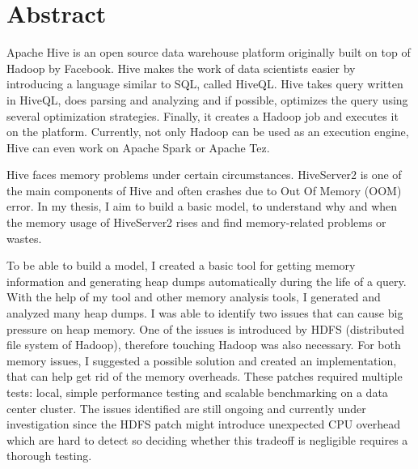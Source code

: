 \vfill
\selectenglish


\chapter*{Abstract}
Apache Hive is an open source data warehouse platform originally built on top of Hadoop by Facebook. Hive makes the work of data scientists easier by introducing a language similar to SQL, called HiveQL. Hive takes query written in HiveQL, does parsing and analyzing and if possible, optimizes the query using several optimization strategies. Finally, it creates a Hadoop job and executes it on the platform. Currently, not only Hadoop can be used as an execution engine, Hive can even work on Apache Spark or Apache Tez. 

Hive faces memory problems under certain circumstances. HiveServer2 is one of the main components of Hive and often crashes due to Out Of Memory (OOM) error. In my thesis, I aim to build a basic model, to understand why and when the memory usage of HiveServer2 rises and find memory-related problems or wastes.

To be able to build a model, I created a basic tool for getting memory information and generating heap dumps automatically during the life of a query. With the help of my tool and other memory analysis tools, I generated and analyzed many heap dumps. I was able to identify two issues that can cause big pressure on heap memory. One of the issues is introduced by HDFS (distributed file system of Hadoop), therefore touching Hadoop was also necessary. For both memory issues, I suggested a possible solution and created an implementation, that can help get rid of the memory overheads. These patches required multiple tests: local, simple performance testing and scalable benchmarking on a data center cluster. The issues identified are still ongoing and currently under investigation since the HDFS patch might introduce unexpected CPU overhead which are hard to detect so deciding whether this tradeoff is negligible requires a thorough testing. 

\vfill
\selectthesislanguage

\setcounter{romanPage}{\value{page}}
